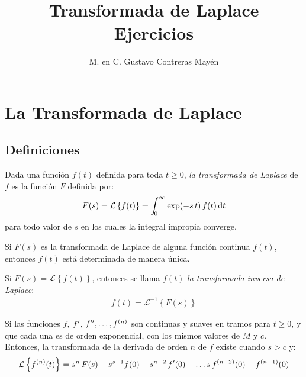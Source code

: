 
\title{Transformada de Laplace \\ \Large{Ejercicios}} \vspace{-3ex}
\author{M. en C. Gustavo Contreras Mayén}
\date{ }
\newcommand{\Cancel}[2][black]{{\color{#1}\cancel{\color{black}#2}}}

\vspace{-4cm}
\maketitle
\fontsize{14}{14}\selectfont
\tableofcontents
\newpage


\section{La Transformada de Laplace}
\subsection{Definiciones}

Dada una función $f(t)$ definida para toda $t \geq 0$, \emph{la transformada de Laplace} de $f$ es la función $F$ definida por:
\begin{align*}
F(s) = \mathcal{L} \left\{ f(t) \right\} = \scaleint{5ex}_{\bs 0}^{\infty} \exp(-s \, t) \, f(t) \dd{t}
\end{align*}
para todo valor de $s$ en los cuales la integral impropia converge.
\par
Si $F(s)$ es la transformada de Laplace de alguna función continua $f(t)$,  entonces $f(t)$ está determinada de manera única.
\par
Si $F(s) = \mathcal{L} \left\{ f(t) \right\}$, entonces se llama $f(t)$ \emph{la transformada inversa de Laplace}:
\begin{align*}
f(t) = \mathcal{L}^{-1} \left\{ F(s) \right\}
\end{align*}

Si las funciones $f$, ${f}^{\prime}$, ${f}^{\prime \prime}, \ldots, {f}^{(n)}$ son continuas y suaves en tramos para $t \geq 0$, y que cada una es de orden exponencial, con los mismos valores de $M$ y $c$. Entonces, la transformada de la derivada de orden $n$ de $f$ existe cuando $s > c$ y:
\begin{align*}
\mathcal{L} \left\{ {f}^{(n)} (t) \right\} = s^{n} \, F(s) - s^{s-1} f(0) - s^{n-2} \, {f}^{\prime}(0) - \ldots s \, {f}^{(n-2)}(0) - {f}^{(n-1)}(0)
\end{align*}

